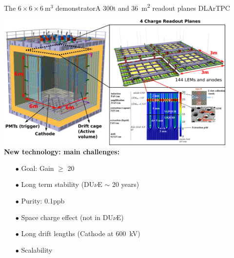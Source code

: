 \documentclass[10pt]{beamer}
\begin{document}
    \begin{frame}{The \texorpdfstring{$6 \times 6 \times \SI{6}{\meter\cubed}$}{666}
    		demonstrator}{A 300t and \SI{36}{\meter\squared} readout planes DLArTPC}
    	\begin{scriptsize}
    			\includegraphics[width=0.9\textwidth]{figures/666/666_full.png}\\
    			\vfill
    			\textbf{New technology: main challenges:}\\
    			\begin{minipage}{0.32\textwidth}
    				\begin{itemize}
    					\item[$\bullet$] Goal: Gain $\geq$ 20
    					\item[$\bullet$] Long term stability (DU$\nu$E $\sim$ 20 years)
    				\end{itemize}
    			\end{minipage}\hfill
    			\begin{minipage}{0.32\textwidth}
    				\begin{itemize}
    					\item[$\bullet$] Purity: 0.1\;ppb
    					\item[$\bullet$] Space charge effect
    					(not in DU$\nu$E)
    				\end{itemize}
	    		\end{minipage}\hfill
	    		\begin{minipage}{0.32\textwidth}
	    			\begin{itemize}
	    				\item[$\bullet$] Long drift lengths (Cathode at \SI{600}{\kilo\volt})
	    				\item[$\bullet$] Scalability
	    			\end{itemize}
	    		\end{minipage}
    	\end{scriptsize} 
    \end{frame}
    
\end{document}
